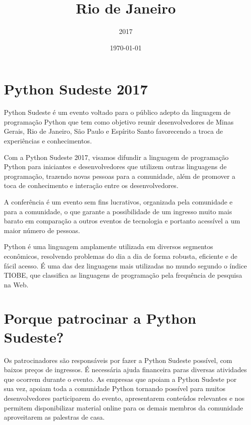 \documentclass[12pt]{article}
\title{Rio de Janeiro}
\author{2017}
\date{\today}
\begin{document}
\maketitle


\section{Python Sudeste 2017}

Python Sudeste é um evento voltado para o público adepto da linguagem de programação Python que tem como objetivo reunir desenvolvedores de Minas Gerais, Rio de Janeiro, São Paulo e Espírito Santo favorecendo a troca de experiências e conhecimentos.

Com a Python Sudeste 2017, visamos difundir a linguagem de programação Python para iniciantes e desenvolvedores que utilizem outras linguagens de programação, trazendo novas pessoas para a comunidade, além de promover a toca de conhecimento e interação entre os desenvolvedores.

A conferência é um evento sem fins lucrativos, organizada pela comunidade e para a comunidade, o que garante a possibilidade de um ingresso muito mais barato em comparação a outros eventos de tecnologia e portanto acessível a um maior número de pessoas.

Python é uma linguagem amplamente utilizada em diversos segmentos econômicos, resolvendo problemas do dia a dia de forma robusta, eficiente e de fácil acesso. É uma das dez linguagens mais utilizadas no mundo segundo o índice TIOBE, que classifica as linguagens de programação pela frequência de pesquisa na Web.

\section{Porque patrocinar a Python Sudeste?}

Os patrocinadores são responsáveis por fazer a Python Sudeste possível, com baixos preços de ingressos. É necessária ajuda financeira paras diversas atividades que ocorrem durante o evento. As empresas que apoiam a Python Sudeste por sua vez, apoiam toda a comunidade Python tornando possível para muitos desenvolvedores participarem do evento, apresentarem conteúdos relevantes e nos permitem disponibilizar material online para os demais membros da comunidade aproveitarem as palestras de casa.
\end{document}
